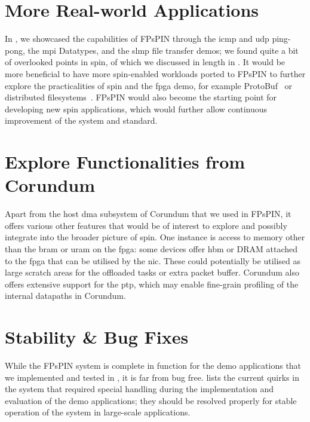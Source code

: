 \section{More Real-world Applications}

In , we showcased the capabilities of FPsPIN through the \ac{icmp} and \ac{udp} ping-pong, the \ac{mpi} Datatypes, and the \ac{slmp} file transfer demos; we found quite a bit of overlooked points in \ac{spin}, of which we discussed in length in . It would be more beneficial to have more \ac{spin}-enabled workloads ported to FPsPIN to further explore the practicalities of \ac{spin} and the \ac{fpga} demo, for example ProtoBuf~\cite{cao_accelerating_2022} or distributed filesystems~\cite{di_girolamo_building_2022}.  FPsPIN would also become the starting point for developing new \ac{spin} applications, which would further allow continuous improvement of the system and standard.

\section{Explore Functionalities from Corundum}

Apart from the host \ac{dma} subsystem of Corundum that we used in FPsPIN, it offers various other features that would be of interest to explore and possibly integrate into the broader picture of \ac{spin}.  One instance is access to memory other than the \ac{bram} or \ac{uram} on the \ac{fpga}: some devices offer \ac{hbm} or DRAM attached to the \ac{fpga} that can be utilised by the \ac{nic}.  These could potentially be utilised as large scratch areas for the offloaded tasks or extra packet buffer.  Corundum also offers extensive support for the \acf{ptp}, which may enable fine-grain profiling of the internal datapaths in Corundum.

\section{Stability \& Bug Fixes}

While the FPsPIN system is complete in function for the demo applications that we implemented and tested in , it is far from bug free.   lists the current quirks in the system that required special handling during the implementation and evaluation of the demo applications; they should be resolved properly for stable operation of the system in large-scale applications.